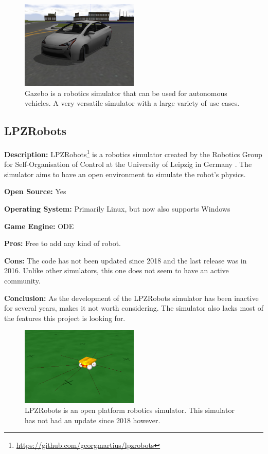 \begin{figure}[H]
    \centering
    \includegraphics[width=0.5\textwidth]{03_Background/Appendix/Simulators/gazebo.png}
    \caption{Gazebo is a robotics simulator that can be used for autonomous vehicles. A very versatile simulator with a large variety of use cases.}
\end{figure}


\subsection{LPZRobots}
\textbf{Description:} LPZRobots\footnote{\url{https://github.com/georgmartius/lpzrobots}} is a robotics simulator created by the Robotics Group for Self-Organisation of Control at the University of Leipzig in Germany \cite{LPZRobots_Website, LPZRobots_book}. The simulator aims to have an open environment to simulate the robot's physics. 

\textbf{Open Source:} Yes

\textbf{Operating System:} Primarily Linux, but now also supports Windows

\textbf{Game Engine:} ODE

\textbf{Pros:} Free to add any kind of robot.

\textbf{Cons:} The code has not been updated since 2018 and the last release was in 2016. Unlike other simulators, this one does not seem to have an active community. 

\textbf{Conclusion:} As the development of the LPZRobots simulator has been inactive for several years, makes it not worth considering. The simulator also lacks most of the features this project is looking for. 

\begin{figure}[H]
    \centering
    \includegraphics[width=0.5\textwidth]{03_Background/Appendix/Simulators/LPZRobots.png}
    \caption{LPZRobots is an open platform robotics simulator. This simulator has not had an update since 2018 however.}
\end{figure}


